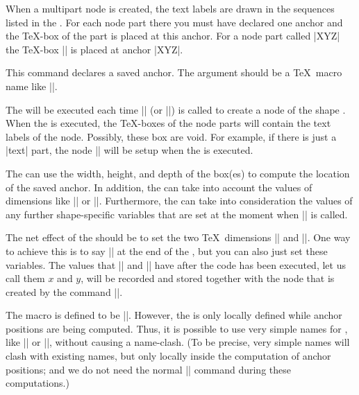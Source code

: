 \begin{command}{\pgfdeclareshape{}}
\begin{command}{\nodeparts{}}
    When a multipart node is created, the text labels are drawn in the
    sequences listed in the . For each node
    part there you must have declared one anchor and the \TeX-box of
    the part is placed at this anchor. For a node part called |XYZ|
    the \TeX-box |\pgfnodepartXYZbox| is placed at anchor |XYZ|.
  \end{command}

  \begin{command}{\savedanchor{}}
    This command declares a saved anchor. The argument 
    should be a \TeX\ macro name like |\centerpoint|.

    The  will be executed each time |\pgfnode| (or
    |\pgfmultipartnode|) is called to  create a node of the shape
    . When the  
    is executed, the \TeX-boxes of the node parts will contain the
    text labels of the node. Possibly, these box are void. For
    example, if there is just a |text| part, the node
    |\pgfnodeparttextbox| will be setup when the  is
    executed. 

    The  can use the width, height, and depth of the
    box(es) to compute the location of the saved anchor. In addition,
    the  can take into account the values of dimensions like
    |\pgfshapeminwidth| or |\pgfshapeinnerxsep|. Furthermore, the
     can take into consideration the values of any further
    shape-specific variables that are set at the moment when
    |\pgfnode| is called.

    The net effect of the  should be to set the two \TeX\
    dimensions |\pgf@x| and |\pgf@y|. One way to achieve this is to
    say |\pgfpoint{|\meta{x value}|}{|\meta{y value}|}| at the end of
    the \meta{code}, but you can also just set these variables.
    The values that |\pgf@x| and |\pgf@y| have after the code has been
    executed, let us call them $x$ and $y$, will be recorded and
    stored together with the node that is created by the command
    |\pgfnode|.

    The macro  is defined to be
    ||. However, the  is only
    locally defined while anchor positions are being computed. Thus,
    it is possible to use very simple names for , like
    |\center| or |\a|, without causing a name-clash. (To be precise,
    very simple \meta{command} names will clash with existing names,
    but only locally inside the computation of anchor positions; and
    we do not need the normal |\center| command during these
    computations.)


\end{command}
\end{command}

